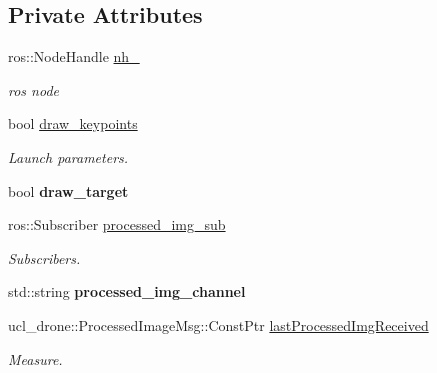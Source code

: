 \subsection*{Private Attributes}
\begin{DoxyCompactItemize}
\item 
\mbox{\label{classVisionGui_ae1984130b804c80a871eef3acb459ce6}} 
ros\+::\+Node\+Handle \hyperlink{classVisionGui_ae1984130b804c80a871eef3acb459ce6}{nh\+\_\+}
\begin{DoxyCompactList}\small\item\em ros node \end{DoxyCompactList}\item 
\mbox{\label{classVisionGui_a48ff0b036731d35858333acc0c3cd336}} 
bool \hyperlink{classVisionGui_a48ff0b036731d35858333acc0c3cd336}{draw\+\_\+keypoints}
\begin{DoxyCompactList}\small\item\em Launch parameters. \end{DoxyCompactList}\item 
\mbox{\label{classVisionGui_a514e7ce268cc5d2c11ef6b2e08c6f6e3}} 
bool {\bfseries draw\+\_\+target}
\item 
\mbox{\label{classVisionGui_ae4a5452537e1ae7541e0d5d08486e28a}} 
ros\+::\+Subscriber \hyperlink{classVisionGui_ae4a5452537e1ae7541e0d5d08486e28a}{processed\+\_\+img\+\_\+sub}
\begin{DoxyCompactList}\small\item\em Subscribers. \end{DoxyCompactList}\item 
\mbox{\label{classVisionGui_a964bc034aaf954786c95550ab2377c03}} 
std\+::string {\bfseries processed\+\_\+img\+\_\+channel}
\item 
\mbox{\label{classVisionGui_a0961cfa70c5e0d7a66660cea4f78d538}} 
ucl\+\_\+drone\+::\+Processed\+Image\+Msg\+::\+Const\+Ptr \hyperlink{classVisionGui_a0961cfa70c5e0d7a66660cea4f78d538}{last\+Processed\+Img\+Received}
\begin{DoxyCompactList}\small\item\em Measure. \end{DoxyCompactList}\item 

\end{DoxyCompactItemize}
